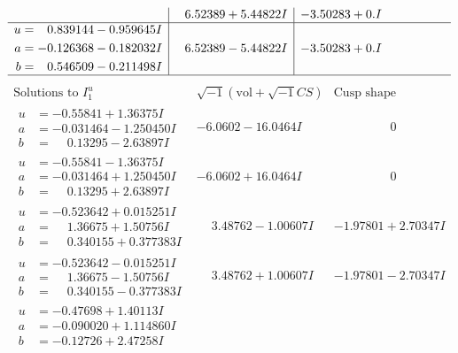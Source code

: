 \documentclass[1p]{elsarticle_modified}
\theoremstyle{definition}
\newcommand{\I}{\sqrt{-1}}
\begin{document}
$$\begin{array}{c|c|c}
 & \phantom{-}6.52389 + 5.44822 I & -3.50283 + 0. I\phantom{ +0.000000I} \\ \hline\begin{aligned}
u &= \phantom{-}0.839144 - 0.959645 I \\
a &= -0.126368 - 0.182032 I \\
b &= \phantom{-}0.546509 - 0.211498 I\end{aligned}
 & \phantom{-}6.52389 - 5.44822 I & -3.50283 + 0. I\phantom{ +0.000000I}\\
 \hline 
 \end{array}$$\newpage$$\begin{array}{c|c|c}  
\text{Solutions to }I^u_{1}& \I (\text{vol} + \sqrt{-1}CS) & \text{Cusp shape}\\
 \hline 
\begin{aligned}
u &= -0.55841 + 1.36375 I \\
a &= -0.031464 - 1.250450 I \\
b &= \phantom{-}0.13295 - 2.63897 I\end{aligned}
 & -6.0602 - 16.0464 I & \phantom{-0.000000 } 0 \\ \hline\begin{aligned}
u &= -0.55841 - 1.36375 I \\
a &= -0.031464 + 1.250450 I \\
b &= \phantom{-}0.13295 + 2.63897 I\end{aligned}
 & -6.0602 + 16.0464 I & \phantom{-0.000000 } 0 \\ \hline\begin{aligned}
u &= -0.523642 + 0.015251 I \\
a &= \phantom{-}1.36675 + 1.50756 I \\
b &= \phantom{-}0.340155 + 0.377383 I\end{aligned}
 & \phantom{-}3.48762 - 1.00607 I & -1.97801 + 2.70347 I \\ \hline\begin{aligned}
u &= -0.523642 - 0.015251 I \\
a &= \phantom{-}1.36675 - 1.50756 I \\
b &= \phantom{-}0.340155 - 0.377383 I\end{aligned}
 & \phantom{-}3.48762 + 1.00607 I & -1.97801 - 2.70347 I \\ \hline\begin{aligned}
u &= -0.47698 + 1.40113 I \\
a &= -0.090020 + 1.114860 I \\
b &= -0.12726 + 2.47258 I\end{aligned}

\end{array}$$
\end{document}
